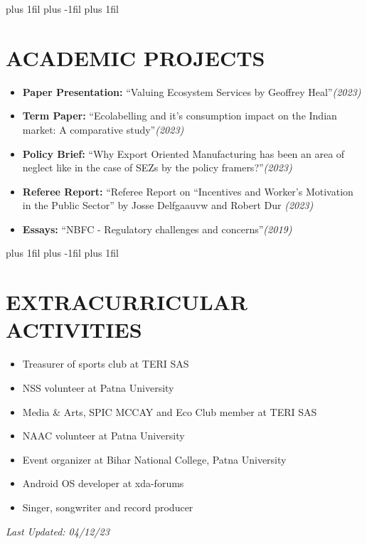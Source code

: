 \documentclass[a4paper,9pt]{extarticle}
\begin{document}
	\leftskip=0pt plus 1fil %
	\rightskip=0pt plus -1fil %
	\parfillskip=0pt plus 1fil %
	\section*{ACADEMIC PROJECTS}
	\begin{itemize}
		\item \textbf{Paper Presentation:} \enquote{Valuing Ecosystem Services by Geoffrey Heal}\textit{(2023)}
		\item \textbf{Term Paper:} \enquote{Ecolabelling and it’s consumption impact on the Indian market: A comparative study}\textit{(2023)}
		\item \textbf{Policy Brief:} \enquote{Why Export Oriented Manufacturing has been an area of neglect like in the case of SEZs by the policy framers?}\textit{(2023)} 
		\item \textbf{Referee Report:} \enquote{Referee Report on “Incentives and Worker’s Motivation in the Public Sector} by Josse Delfgaauvw and Robert Dur \textit{(2023)}
		\item \textbf{Essays:} \enquote{NBFC - Regulatory challenges and concerns}\textit{(2019)}
	\end{itemize}
	
    \leftskip=0pt plus 1fil %
	\rightskip=0pt plus -1fil %
	\parfillskip=0pt plus 1fil %
	\section*{EXTRACURRICULAR ACTIVITIES}
	\begin{itemize}
		\item Treasurer of sports club at TERI SAS
		\item NSS volunteer at Patna University
		\item Media \& Arts, SPIC MCCAY and Eco Club member at TERI SAS
		\item NAAC volunteer at Patna University
		\item Event organizer at Bihar National College, Patna University
		\item Android OS developer at xda-forums
		\item Singer, songwriter and record producer 
	\end{itemize}
	
	\raggedleft
	\vspace{2mm} %
	{\textit{Last Updated: 04/12/23}}
	
\end{document}
